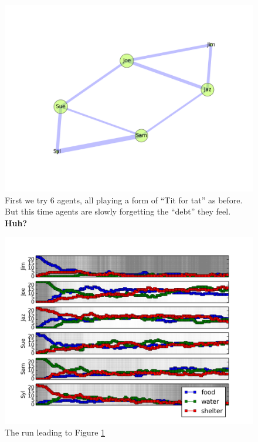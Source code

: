 \documentclass[11pt]{article}
\begin{document}
\begin{figure}[b]
\includegraphics[width=.85\textwidth]{allTFT_little_memory_result}
\caption{\label{fig:allTFT_little_memory_result} 
First we try 6 agents, all playing a form of ``Tit for tat'' as before. But this time agents are slowly forgetting the ``debt'' they feel.  {\bf Huh?}}
\end{figure}

\begin{figure}[b]
\includegraphics[width=\textwidth]{allTFT_little_memory_seq}
\caption{\label{fig:allTFT_little_memory_seq} 
The run leading to Figure \ref{fig:allTFT_little_memory_result} }
\end{figure}

\pagebreak
\end{document}
